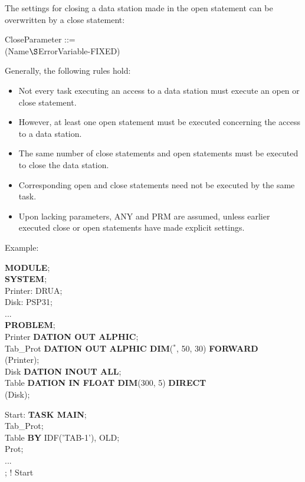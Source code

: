 The settings for closing a data station made in the open statement can
be overwritten by a close statement:

CloseParameter ::=\\
 (Name$\S $ErrorVariable-FIXED)

Generally, the following rules hold:
\begin{itemize}
\item Not every task executing an access to a data station must execute
an open or close statement.
\item However, at least one open statement must be executed concerning
the access to a data station.
\item The same number of close statements and open statements must
be executed to close the data station.
\item Corresponding open and close statements need not be executed by
the same task.
\item Upon lacking parameters, ANY and PRM are assumed, unless earlier
executed close or open statements have made explicit settings.
\end{itemize}

Example:

{\bf MODULE};\\
{\bf SYSTEM};\\
\x Printer: DRUA;\\
\x Disk: PSP31;\\
\x ... \\
{\bf PROBLEM};\\
 Printer {\bf DATION OUT  ALPHIC};\\
 Tab\_Prot {\bf DATION OUT ALPHIC DIM}($^*$, 50, 30) {\bf FORWARD}\\
\x {}(Printer);\\
 Disk {\bf DATION INOUT  ALL};\\
 Table {\bf DATION IN FLOAT DIM}(300, 5) {\bf DIRECT}\\
\x {}(Disk);

Start: {\bf TASK MAIN};\\
 Tab\_Prot;\\
 Table {\bf BY} IDF('TAB-1'), OLD;\\
 Prot;\\
\x ...\\
; ! Start

